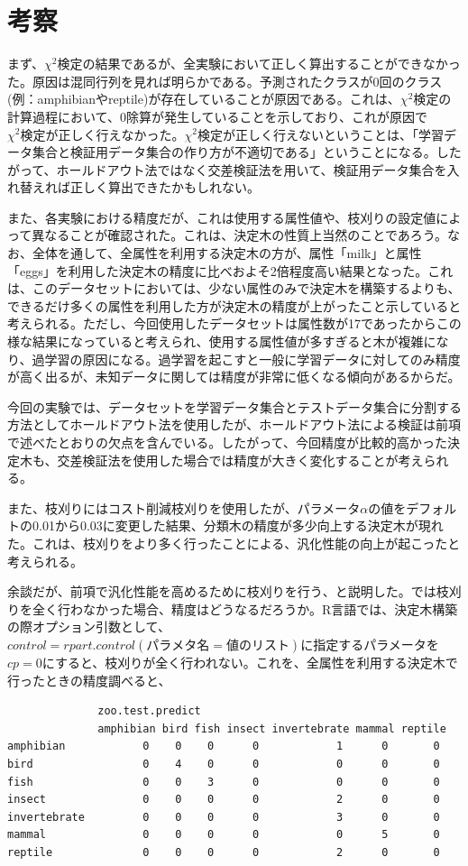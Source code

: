 \documentclass[dvipdfmx]{jsarticle}
\begin{document}
\section{考察}
まず、$χ^{2}検定$の結果であるが、全実験において正しく算出することができなかった。原因は混同行列を見れば明らかである。予測されたクラスが0回のクラス(例：amphibianやreptile)が存在していることが原因である。これは、$χ^{2}検定$の計算過程において、0除算が発生していることを示しており、これが原因で$χ^{2}検定$が正しく行えなかった。$χ^{2}検定$が正しく行えないということは、「学習データ集合と検証用データ集合の作り方が不適切である」ということになる。したがって、ホールドアウト法ではなく交差検証法を用いて、検証用データ集合を入れ替えれば正しく算出できたかもしれない。\par
また、各実験における精度だが、これは使用する属性値や、枝刈りの設定値によって異なることが確認された。これは、決定木の性質上当然のことであろう。なお、全体を通して、全属性を利用する決定木の方が、属性「milk」と属性「eggs」を利用した決定木の精度に比べおよそ2倍程度高い結果となった。これは、このデータセットにおいては、少ない属性のみで決定木を構築するよりも、できるだけ多くの属性を利用した方が決定木の精度が上がったこと示していると考えられる。ただし、今回使用したデータセットは属性数が17であったからこの様な結果になっていると考えられ、使用する属性値が多すぎると木が複雑になり、過学習の原因になる。過学習を起こすと一般に学習データに対してのみ精度が高く出るが、未知データに関しては精度が非常に低くなる傾向があるからだ。\par
今回の実験では、データセットを学習データ集合とテストデータ集合に分割する方法としてホールドアウト法を使用したが、ホールドアウト法による検証は前項で述べたとおりの欠点を含んでいる。したがって、今回精度が比較的高かった決定木も、交差検証法を使用した場合では精度が大きく変化することが考えられる。\par
また、枝刈りにはコスト削減枝刈りを使用したが、パラメータ$\alpha$の値をデフォルトの0.01から0.03に変更した結果、分類木の精度が多少向上する決定木が現れた。これは、枝刈りをより多く行ったことによる、汎化性能の向上が起こったと考えられる。\par
余談だが、前項で汎化性能を高めるために枝刈りを行う、と説明した。では枝刈りを全く行わなかった場合、精度はどうなるだろうか。R言語では、決定木構築の際オプション引数として、$control = rpart.control( パラメタ名 = 値のリスト )$に指定するパラメータを$cp=0$にすると、枝刈りが全く行われない。これを、全属性を利用する決定木で行ったときの精度調べると、
\begin{verbatim}
              zoo.test.predict
              amphibian bird fish insect invertebrate mammal reptile
amphibian            0    0    0      0            1      0       0
bird                 0    4    0      0            0      0       0
fish                 0    0    3      0            0      0       0
insect               0    0    0      0            2      0       0
invertebrate         0    0    0      0            3      0       0
mammal               0    0    0      0            0      5       0
reptile              0    0    0      0            2      0       0
\end{verbatim}
\end{document}
